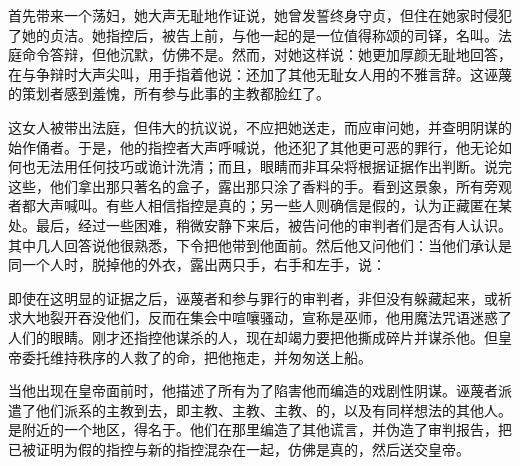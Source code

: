 首先带来一个荡妇，她大声无耻地作证说，她曾发誓终身守贞，但住在她家时侵犯了她的贞洁。她指控后，被告上前，与他一起的是一位值得称颂的司铎，名叫。法庭命令答辩，但他沉默，仿佛不是。然而，对她这样说：她更加厚颜无耻地回答，在与争辩时大声尖叫，用手指着他说：还加了其他无耻女人用的不雅言辞。这诬蔑的策划者感到羞愧，所有参与此事的主教都脸红了。\par

这女人被带出法庭，但伟大的抗议说，不应把她送走，而应审问她，并查明阴谋的始作俑者。于是，他的指控者大声呼喊说，他还犯了其他更可恶的罪行，他无论如何也无法用任何技巧或诡计洗清；而且，眼睛而非耳朵将根据证据作出判断。说完这些，他们拿出那只著名的盒子，露出那只涂了香料的手。看到这景象，所有旁观者都大声喊叫。有些人相信指控是真的；另一些人则确信是假的，认为正藏匿在某处。最后，经过一些困难，稍微安静下来后，被告问他的审判者们是否有人认识。其中几人回答说他很熟悉，下令把他带到他面前。然后他又问他们：当他们承认是同一个人时，脱掉他的外衣，露出两只手，右手和左手，说：\par

即使在这明显的证据之后，诬蔑者和参与罪行的审判者，非但没有躲藏起来，或祈求大地裂开吞没他们，反而在集会中喧嚷骚动，宣称是巫师，他用魔法咒语迷惑了人们的眼睛。刚才还指控他谋杀的人，现在却竭力要把他撕成碎片并谋杀他。但皇帝委托维持秩序的人救了的命，把他拖走，并匆匆送上船。\par

当他出现在皇帝面前时，他描述了所有为了陷害他而编造的戏剧性阴谋。诬蔑者派遣了他们派系的主教到去，即主教、主教、主教、的，以及有同样想法的其他人。是附近的一个地区，得名于。他们在那里编造了其他谎言，并伪造了审判报告，把已被证明为假的指控与新的指控混杂在一起，仿佛是真的，然后送交皇帝。\par


